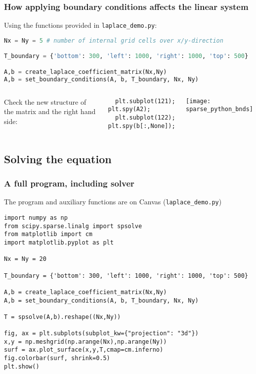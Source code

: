 \begin{frame}[fragile]
  \frametitle{How applying boundary conditions affects the linear system}
  Using the functions provided in \lstinline|laplace_demo.py|:
  \begin{lstlisting}[language=Python]
Nx = Ny = 5 # number of internal grid cells over x/y-direction

T_boundary = {'bottom': 300, 'left': 1000, 'right': 1000, 'top': 500}

A,b = create_laplace_coefficient_matrix(Nx,Ny)
A,b = set_boundary_conditions(A, b, T_boundary, Nx, Ny)  
  \end{lstlisting}
  \pause
  \begin{columns}[T]
    Check the new structure of the matrix and the right hand side:
      \begin{lstlisting}
  plt.subplot(121); plt.spy(A2);
  plt.subplot(122); plt.spy(b[:,None]);
      \end{lstlisting}
    \centering\texttt{[image: sparse\_python\_bnds]}
  \end{columns}
\end{frame}

\subsection*{Solving the equation}
\begin{frame}[fragile]
  \frametitle{A full program, including solver}
  The program and auxiliary functions are on Canvas (\lstinline$laplace_demo.py$)
      \begin{lstlisting}
import numpy as np
from scipy.sparse.linalg import spsolve
from matplotlib import cm
import matplotlib.pyplot as plt

Nx = Ny = 20

T_boundary = {'bottom': 300, 'left': 1000, 'right': 1000, 'top': 500}

A,b = create_laplace_coefficient_matrix(Nx,Ny)
A,b = set_boundary_conditions(A, b, T_boundary, Nx, Ny)

T = spsolve(A,b).reshape((Nx,Ny))

fig, ax = plt.subplots(subplot_kw={"projection": "3d"})
x,y = np.meshgrid(np.arange(Nx),np.arange(Ny))
surf = ax.plot_surface(x,y,T,cmap=cm.inferno)
fig.colorbar(surf, shrink=0.5)
plt.show()
      \end{lstlisting}
\end{frame}

